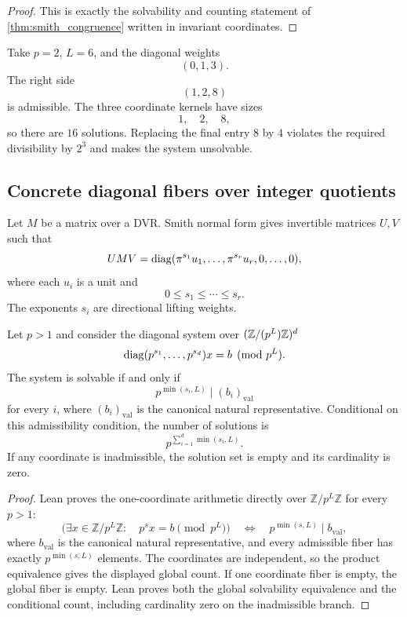 \begin{proof}
This is exactly the solvability and counting statement of \cref{thm:smith_congruence} written in invariant coordinates.
\end{proof}

\begin{example}\label{ex:smith_three}
Take $p=2$, $L=6$, and the diagonal weights
\[
(0,1,3).
\]
The right side
\[
(1,2,8)
\]
is admissible.  The three coordinate kernels have sizes
\[
1,
\quad2,
\quad8,
\]
so there are $16$ solutions.  Replacing the final entry $8$ by $4$ violates the required divisibility by $2^3$ and makes the system unsolvable.
\end{example}

\subsection{Concrete diagonal fibers over integer quotients}

Let $M$ be a matrix over a DVR. Smith normal form gives invertible matrices $U,V$ such that
\[
UMV
=
\operatorname{diag}(\pi^{s_1}u_1,\ldots,\pi^{s_r}u_r,0,\ldots,0),
\]
where each $u_i$ is a unit and
\[
0\le s_1\le\cdots\le s_r.
\]
The exponents $s_i$ are directional lifting weights.

\begin{theorem}\label{thm:smith-solve}
Let $p>1$ and consider the diagonal system over
$(\mathbb Z/(p^L)\mathbb Z)^d$
\[
\operatorname{diag}(p^{s_1},\ldots,p^{s_d})x=b
\pmod{p^L}.
\]
The system is solvable if and only if
\[
p^{\min(s_i,L)}\mid (b_i)_{\mathrm{val}}
\]
for every $i$, where $(b_i)_{\mathrm{val}}$ is the canonical natural
representative. Conditional on this admissibility condition, the number of
solutions is
\[
\boxed{
p^{\sum_{i=1}^d\min(s_i,L)}.
}
\]
If any coordinate is inadmissible, the solution set is empty and its
cardinality is zero.
\end{theorem}

\begin{proof}
Lean proves the one-coordinate arithmetic directly over
$\mathbb Z/p^L\mathbb Z$ for every $p>1$:
\[
\bigl(\exists x\in\mathbb Z/p^L\mathbb Z:\quad p^s x=b\pmod{p^L}\bigr)
\quad\Longleftrightarrow\quad
p^{\min(s,L)}\mid b_{\mathrm{val}},
\]
where $b_{\mathrm{val}}$ is the canonical natural representative, and every
admissible fiber has exactly $p^{\min(s,L)}$ elements. The coordinates are
independent, so the product equivalence gives the displayed global count. If
one coordinate fiber is empty, the global fiber is empty. Lean proves both the
global solvability equivalence and the conditional count, including
cardinality zero on the inadmissible branch.
\end{proof}

